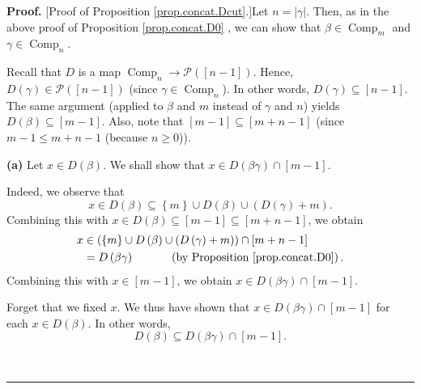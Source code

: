 \documentclass[numbers=enddot,12pt,final,onecolumn,notitlepage]{scrartcl}%
\theoremstyle{definition}
\newenvironment{proof}[1][Proof]{\noindent\textbf{#1.} }{\ \rule{0.5em}{0.5em}}
\begin{document}
\begin{proof}
[Proof of Proposition \ref{prop.concat.Dcut}.]Let $n=\left\vert \gamma
\right\vert $. Then, as in the above proof of Proposition \ref{prop.concat.D0}%
, we can show that $\beta\in\operatorname*{Comp}\nolimits_{m}$ and $\gamma
\in\operatorname*{Comp}\nolimits_{n}$.

Recall that $D$ is a map $\operatorname*{Comp}\nolimits_{n}\rightarrow
\mathcal{P}\left(  \left[  n-1\right]  \right)  $. Hence, $D\left(
\gamma\right)  \in\mathcal{P}\left(  \left[  n-1\right]  \right)  $ (since
$\gamma\in\operatorname*{Comp}\nolimits_{n}$). In other words, $D\left(
\gamma\right)  \subseteq\left[  n-1\right]  $. The same argument (applied to
$\beta$ and $m$ instead of $\gamma$ and $n$) yields $D\left(  \beta\right)
\subseteq\left[  m-1\right]  $. Also, note that $\left[  m-1\right]
\subseteq\left[  m+n-1\right]  $ (since $m-1\leq m+n-1$ (because $n\geq0$)).
\medskip

\textbf{(a)} Let $x\in D\left(  \beta\right)  $. We shall show that $x\in
D\left(  \beta\gamma\right)  \cap\left[  m-1\right]  $.

Indeed, we observe that%
\[
x\in D\left(  \beta\right)  \subseteq\left\{  m\right\}  \cup D\left(
\beta\right)  \cup\left(  D\left(  \gamma\right)  +m\right)  .
\]
Combining this with $x\in D\left(  \beta\right)  \subseteq\left[  m-1\right]
\subseteq\left[  m+n-1\right]  $, we obtain%
\begin{align*}
x  &  \in\left(  \left\{  m\right\}  \cup D\left(  \beta\right)  \cup\left(
D\left(  \gamma\right)  +m\right)  \right)  \cap\left[  m+n-1\right] \\
&  =D\left(  \beta\gamma\right)  \ \ \ \ \ \ \ \ \ \ \left(  \text{by
Proposition \ref{prop.concat.D0}}\right)  .
\end{align*}
Combining this with $x\in\left[  m-1\right]  $, we obtain $x\in D\left(
\beta\gamma\right)  \cap\left[  m-1\right]  $.

Forget that we fixed $x$. We thus have shown that $x\in D\left(  \beta
\gamma\right)  \cap\left[  m-1\right]  $ for each $x\in D\left(  \beta\right)
$. In other words,%
\begin{equation}
D\left(  \beta\right)  \subseteq D\left(  \beta\gamma\right)  \cap\left[
m-1\right]  . \label{pf.prop.concat.Dcut.a.1}%
\end{equation}



\end{proof}
\end{document}
